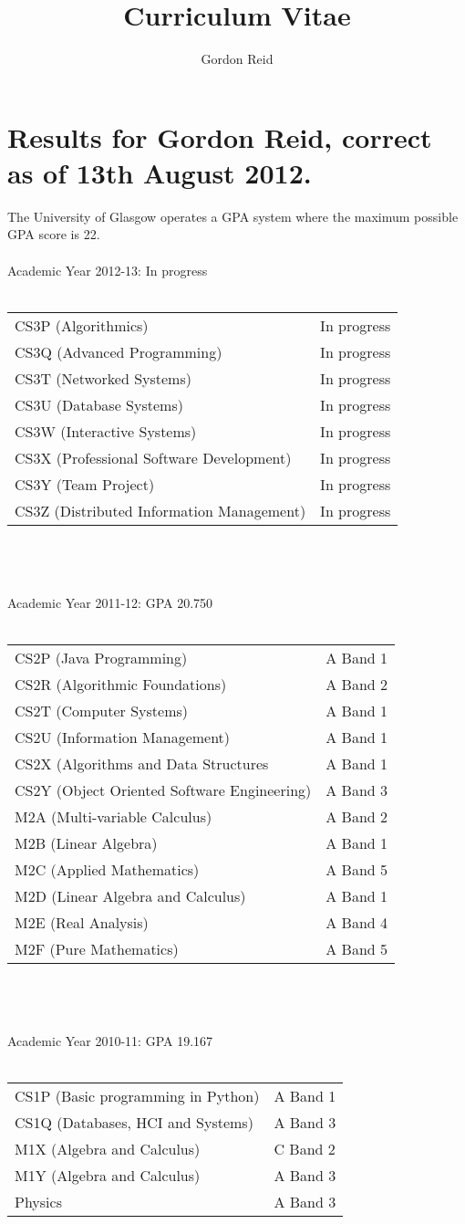 \documentclass[10pt,a4paper]{article}
\title{Curriculum Vitae}
\author{Gordon Reid}
\begin{document}
\section*{Results for Gordon Reid, correct as of 13th August 2012.}
The University of Glasgow operates a GPA system where the maximum possible GPA score is 22.\\\\
Academic Year 2012-13: In progress\\\\
\begin{tabular}{p{10cm}l}
	CS3P (Algorithmics) & In progress\\
	CS3Q (Advanced Programming) & In progress\\
	CS3T (Networked Systems) & In progress\\
	CS3U (Database Systems) & In progress\\
	CS3W (Interactive Systems) & In progress\\
	CS3X (Professional Software Development) & In progress\\
	CS3Y (Team Project) & In progress\\
	CS3Z (Distributed Information Management) & In progress\\
\end{tabular}
\\\\\\
Academic Year 2011-12: GPA 20.750\\\\
\begin{tabular}{p{10cm}l}
	CS2P (Java Programming) & A Band 1\\
	CS2R (Algorithmic Foundations) & A Band 2\\
	CS2T (Computer Systems) & A Band 1\\
	CS2U (Information Management) & A Band 1\\
	CS2X (Algorithms and Data Structures & A Band 1\\
	CS2Y (Object Oriented Software Engineering) & A Band 3\\
	M2A (Multi-variable Calculus) & A Band 2\\
	M2B (Linear Algebra) & A Band 1\\
	M2C (Applied Mathematics) & A Band 5\\
	M2D (Linear Algebra and Calculus) & A Band 1\\
	M2E (Real Analysis) & A Band 4\\
	M2F (Pure Mathematics) & A Band 5\\
\end{tabular}
\\\\\\
Academic Year 2010-11: GPA 19.167\\\\
\begin{tabular}{p{10cm}l}
	CS1P (Basic programming in Python) & A Band 1\\
	CS1Q (Databases, HCI and Systems) & A Band 3\\
	M1X (Algebra and Calculus) & C Band 2\\
	M1Y (Algebra and Calculus) & A Band 3\\
	Physics & A Band 3\\
\end{tabular}
\end{document}
